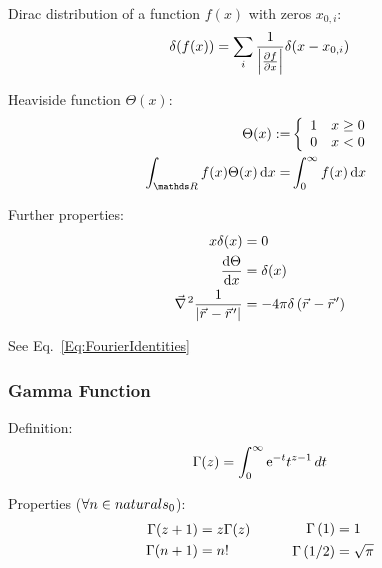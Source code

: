 			\noindent
			Dirac distribution of a function $f(x)$ with zeros $x_{0,i}$:
			\begin{equation}
				\delta(f(x)) = \sum_i \frac{1}{\abs{\pdv{f}{x}(x_{0,i})}}\delta(x-x_{0,i})
			\end{equation}

			\noindent
			Heaviside function $\Theta(x)$:
			\begin{align}
				\Theta(x) :=& \left\{\begin{array}{ll}
					1 & x\ge 0 \\
					0 & x<0    \\
				\end{array}\right. \\
				\int_{\reals } f(x)\Theta(x)\dd{x} =& \int_{0}^{\infty} f(x)\dd{x}
			\end{align}

			\noindent
			Further properties:
			\begin{align}
				x \delta(x) &= 0\\
				\dv{\Theta}{x}(x) &= \delta(x) \\
				\Nabla^2\frac{1}{\abs{\vec{r} - \vec{r}'}} &= -4\pi\delta\left(\vec{r} - \vec{r}'\right)
			\end{align}

			\noindent
			See Eq.~\ref{Eq:FourierIdentities}

		\subsubsection{Gamma Function}
			\noindent
			Definition:
			\begin{equation}
				\Gamma(z)=\int_0^{\infty}\mathrm{e}^{-t}t^{z-1}\,dt
			\end{equation}

			\noindent
			Properties ($\forall n\in\\naturals _0$):
			\begin{equation}
				\begin{aligned}
					\Gamma(z+1)&=z\Gamma(z) \\
					\Gamma(n+1) &= n!
				\end{aligned}
				\hspace{30pt}
				\begin{aligned}
					\Gamma\left(1 \right)&=1 \\
					\Gamma\left(1/2 \right)&=\sqrt{\pi} \\
				\end{aligned}
			\end{equation}

